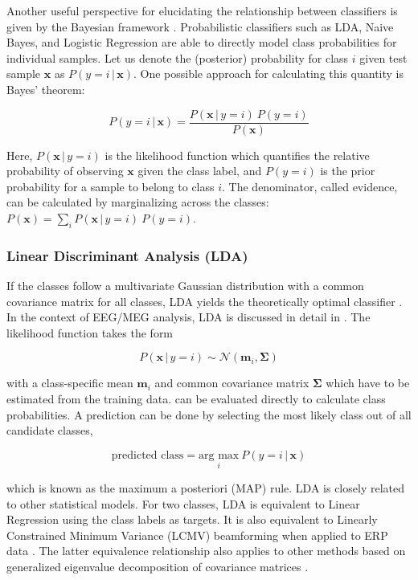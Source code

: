 \documentclass[utf8]{frontiersSCNS} %
\newcommand{\m}{\mathbf{m}}
\newcommand{\x}{\mathbf{x}}
\begin{document}
Another useful perspective for elucidating the relationship between  classifiers is given by the Bayesian framework \citep{Bishop2007}. Probabilistic classifiers such as LDA, Naive Bayes, and Logistic Regression are able to directly model class probabilities for individual samples. Let us denote the (posterior) probability for class $i$ given  test sample $\x$ as $P(y = i\,|\,\x)$. One possible approach for calculating this quantity is Bayes' theorem:

\begin{equation}
\label{eq:bayes}
P(y = i\,|\,\x) = \frac{P(\x\,|\,y = i)\  P(y = i)}{P(\x)}
\end{equation}

Here, $P(\x\,|\,y = i)$ is the likelihood function which quantifies the relative probability of observing $\x$ given the class label, and $P(y = i)$ is the prior probability for a sample to belong to class $i$. The denominator, called evidence, can be calculated by marginalizing across the classes: $P(\x) = \sum_i P(\x\,|\,y = i)\  P(y = i)$.

\subsubsection{Linear Discriminant Analysis (LDA)}\label{sec:lda}

If the classes follow a multivariate Gaussian distribution with a common covariance matrix for all classes, LDA yields the theoretically optimal classifier \citep{Duda1998}. In the context of EEG/MEG analysis, LDA is discussed in detail in \cite{Blankertz2011}. The likelihood function takes the form

\begin{equation}
\label{eq:lda_likelihood}
P(\x\,|\,y = i) \sim \mathcal{N}(\m_i, \mathbf{\Sigma})
\end{equation}

with a class-specific mean $\m_i$ and common covariance matrix $\mathbf{\Sigma}$ which have to be  estimated from the training data.  can be evaluated directly to calculate class probabilities. A prediction can be done by selecting the most likely class out of all candidate classes,

\begin{equation*}
\text{predicted class} = \underset{i}{\text{arg max}}\ P(y = i\,|\,\x)
\end{equation*}

which is known as the maximum a posteriori (MAP) rule. LDA is closely related to other statistical models. For two classes, LDA is equivalent to Linear Regression using the class labels as targets. It is also equivalent to Linearly Constrained Minimum Variance (LCMV) beamforming when applied to ERP data \citep{Treder2016}. The latter equivalence relationship also applies to other methods based on generalized eigenvalue decomposition of covariance matrices \citep{DeCheveigne2014JointAnalysis}.
\end{document}
